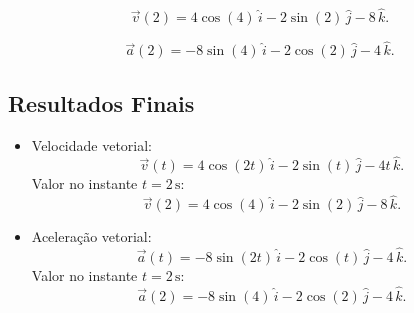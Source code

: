 \[
\vec{v}(2) = 4 \cos(4) \, \hat{i} - 2 \sin(2) \, \hat{j} - 8 \, \hat{k}.
\]

\[
\vec{a}(2) = -8 \sin(4) \, \hat{i} - 2 \cos(2) \, \hat{j} - 4 \, \hat{k}.
\]

\subsection*{Resultados Finais}
\begin{itemize}
    \item Velocidade vetorial:
    \[
    \vec{v}(t) = 4 \cos(2t) \, \hat{i} - 2 \sin(t) \, \hat{j} - 4t \, \hat{k}.
    \]
    Valor no instante \(t = 2 \, \text{s}\):
    \[
    \vec{v}(2) = 4 \cos(4) \, \hat{i} - 2 \sin(2) \, \hat{j} - 8 \, \hat{k}.
    \]

    \item Aceleração vetorial:
    \[
    \vec{a}(t) = -8 \sin(2t) \, \hat{i} - 2 \cos(t) \, \hat{j} - 4 \, \hat{k}.
    \]
    Valor no instante \(t = 2 \, \text{s}\):
    \[
    \vec{a}(2) = -8 \sin(4) \, \hat{i} - 2 \cos(2) \, \hat{j} - 4 \, \hat{k}.
    \]
\end{itemize}
